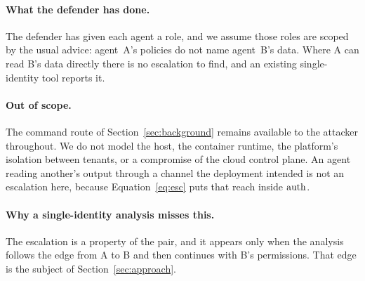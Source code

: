 \paragraph{What the defender has done.}
The defender has given each agent a role, and we assume those roles are scoped
by the usual advice: agent~A's policies do not name agent~B's data. Where A
can read B's data directly there is no escalation to find, and an existing
single-identity tool reports it.

\paragraph{Out of scope.}
The command route of Section~\ref{sec:background} remains available to the
attacker throughout. We do not model the host, the container runtime, the platform's isolation
between tenants, or a compromise of the cloud control plane. An agent reading
another's output through a channel the deployment intended is not an
escalation here, because Equation~\ref{eq:esc} puts that reach inside
$\mathrm{auth}$.

\paragraph{Why a single-identity analysis misses this.}
The escalation is a property of the pair, and it appears only when the analysis
follows the edge from A to B and then continues with B's permissions. That edge
is the subject of Section~\ref{sec:approach}.
